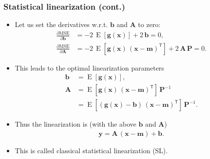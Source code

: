 \documentclass[first=dgreen,second=purple,presentation]{elecslides}
\newcommand{\mbf}[1]{\mathbf{#1}}
\newcommand{\T}[0]{\mathsf{T}}
\DeclareMathOperator{\E}{E}
\newcommand{\vb}{\mbf{b}}
\newcommand{\vg}{\mbf{g}}
\newcommand{\vm}{\mbf{m}}
\newcommand{\vx}{\mbf{x}}
\newcommand{\vy}{\mbf{y}}
\newcommand{\MA}{\mbf{A}}
\newcommand{\MP}{\mbf{P}}
\begin{document}
\begin{frame}
 \frametitle{Statistical linearization (cont.)}

\begin{itemize}[<+->]
\item Let us \alert{set the derivatives} w.r.t. $\vb$ and $\MA$ to \alert{zero}:
%
\begin{equation}
\begin{split}
  \frac{\partial \mathrm{MSE}}{\partial \vb} &= - 2 \, \E\left[ \vg(\vx) \right] + 2 \, \vb = 0, \\
  \frac{\partial \mathrm{MSE}}{\partial \MA} &= -2 \, \E\left[ \vg(\vx) \, (\vx - \vm)^\T \right] + 2 \, \MA \, \MP = 0.
\end{split}
\nonumber
\end{equation}
%
\item This leads to the \alert{optimal linearization parameters}
%
\begin{equation}
\begin{split}
  \vb &= \E\left[ \vg(\vx) \right], \\
  \MA &= \E\left[ \vg(\vx) \, (\vx - \vm)^\T \right] \, \MP^{-1} \\
  &= \E\left[ (\vg(\vx) - \vb) \, (\vx - \vm)^\T \right] \, \MP^{-1}.
\end{split}
\nonumber
\end{equation}

\item Thus the \alert{linearization} is (with the above $\vb$ and $\MA$)
%
\begin{equation}
\begin{split}
  \vy = \MA \, (\vx - \vm) + \vb.
\end{split}
\nonumber
\end{equation}

\item This is called classical \alert{statistical linearization (SL)}.
\end{itemize}
\end{frame}
\end{document}
